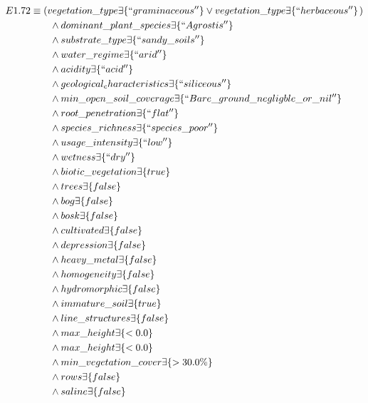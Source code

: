 \documentclass[authoryear, review,12pt,number]{elsarticle}
\begin{document}
\begin{align*}
E1.72 &\equiv \left( vegetation\_type \exists \{``graminaceous''\} \lor
vegetation\_type \exists \{``herbaceous''\} \right.)\\ &\qquad {} \land
dominant\_plant\_species \exists \{``Agrostis'' \} \\ &\qquad {} \land
substrate\_type \exists \{``sandy\_soils''\} \\ &\qquad {} \land water\_regime
\exists \{``arid''\} \\ &\qquad {} \land acidity \exists \{``acid''\} \\
&\qquad {} \land geological_characteristics \exists \{``siliceous''\}\\ &\qquad
\land min\_open\_soil\_coverage \exists
\{``Bare\_ground\_negligble\_or\_nil''\} \nonumber \\ &\qquad {} \land
root\_penetration \exists \{``flat''\} \\ &\qquad {} \land species\_richness
\exists \{``species\_poor''\}\\ &\qquad {} \land usage\_intensity \exists
\{``low''\} \\ &\qquad {} \land wetness \exists \{``dry''\} \\ &\qquad {} \land
biotic\_vegetation \exists \{true\}\\ &\qquad {} \land trees \exists \{false\}
\\ &\qquad {} \land bog \exists \{false\}\\ &\qquad {} \land bosk \exists
\{false\}\\ &\qquad {} \land cultivated \exists \{false\}\\ &\qquad {} \land
depression \exists \{false\}\\  &\qquad {} \land heavy\_metal \exists
\{false\}\\  &\qquad {} \land homogeneity \exists \{false\}\\   &\qquad {}
\land hydromorphic \exists \{false\}\\  &\qquad {} \land immature\_soil \exists
\{true\}\\  &\qquad {} \land line\_structures \exists \{false\}\\   &\qquad {}
\land max\_height \exists \{<0.0\}\\   &\qquad {} \land max\_height \exists
\{<0.0\}\\   &\qquad {} \land min\_vegetation\_cover \exists \{>30.0\%\}\\
&\qquad {} \land rows \exists \{false\}\\   &\qquad {} \land saline \exists
\{false\}\\ \end{align*}
\end{document}
